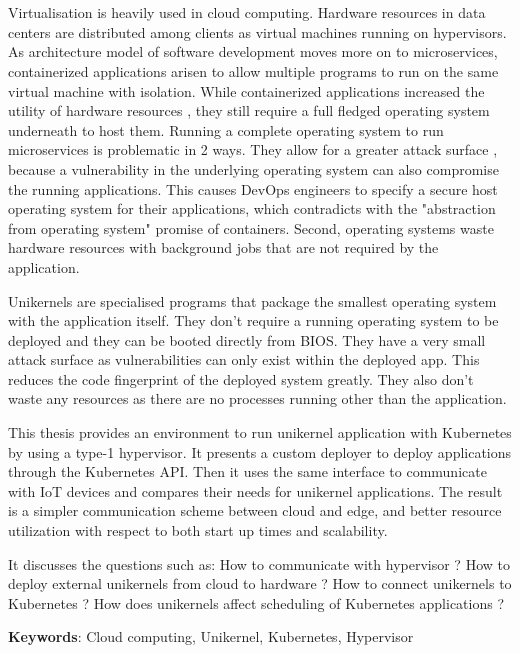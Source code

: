 \chapter{\abstractname}

Virtualisation is heavily used in cloud computing. Hardware resources in data centers are distributed among clients as virtual machines running on hypervisors. As architecture model of software development moves more on to microservices, containerized applications arisen to allow multiple programs to run on the same virtual machine with isolation. While containerized applications increased the utility of hardware resources , they still require a full fledged operating system underneath to host them.
Running a complete operating system to run microservices is problematic in 2 ways. They allow for a greater attack surface , because a vulnerability in the underlying operating system can also compromise the running applications. This causes DevOps engineers to specify a secure host operating system for their applications, which contradicts with the "abstraction from operating system" promise of containers. Second, operating systems waste hardware resources with background jobs that are not required by the application. 

Unikernels are specialised programs that package the smallest operating system with the application itself. They don't require a running operating system to be deployed and they can be booted directly from BIOS. They have a very small attack surface as vulnerabilities can only exist within the deployed app. This reduces the code fingerprint of the deployed system greatly. They also don't waste any resources as there are no processes running other than the application. 

This thesis provides an environment to run unikernel application with Kubernetes by using a type-1 hypervisor. It presents a custom deployer to deploy applications through the Kubernetes API. Then it uses the same interface to communicate with IoT devices and compares their needs for unikernel applications. The result is a simpler communication scheme between cloud and edge, and better resource utilization with respect to both start up times and scalability.

It discusses the questions such as: How to communicate with hypervisor ? How to deploy external unikernels from cloud to hardware ? How to connect unikernels to Kubernetes ? How does unikernels affect scheduling of Kubernetes applications ?

\textbf{Keywords}: Cloud computing, Unikernel, Kubernetes, Hypervisor
